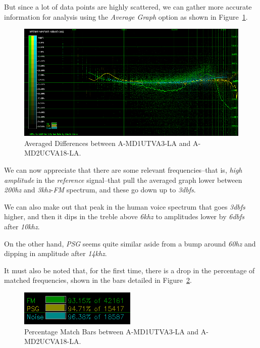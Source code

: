 \documentclass[10pt,a4paper]{report}
\newcommand{\hz}[1]{\textit{\mbox{#1\acrshort{hz}}}}
\newcommand{\khz}[1]{\textit{\mbox{#1\acrshort{khz}}}}
\newcommand{\db}[1]{\textit{\mbox{#1\acrshort{dbfs}}}}
\begin{document}
But since a lot of data points are highly scattered, we can gather more accurate information for analysis using the \textit{Average Graph} option as shown in Figure~\ref{fig:A-MD1UTVA3-LA_vs_A-MD2UCVA18-LA_AVG}.

\begin{figure}[H]
	\centering
	\includegraphics[width=1.0\linewidth]{images/results/5-2-A-MD1UTVA3-LA_vs_A-MD2UCVA18-LA.png}
	\caption[A-MD1UTVA3-LA vs A-MD2UCVA18-LA Averaged]{Averaged Differences between A-MD1UTVA3-LA and A-MD2UCVA18-LA.}
	\label{fig:A-MD1UTVA3-LA_vs_A-MD2UCVA18-LA_AVG}
\end{figure}

We can now appreciate that there are some relevant frequencies--that is, \textit{high amplitude} in the \textit{reference} signal--that pull the averaged graph lower between \hz{200} and \khz{3}-\textit{FM} spectrum, and these go down up to \db{3}.

We can also make out that peak in the human voice spectrum that goes \db{3} higher, and then it dips in the treble above \khz{6} to amplitudes lower by \db{6} after \khz{10}.

On the other hand, \textit{PSG} seems quite similar aside from a bump around \hz{60} and dipping in amplitude after \khz{14}.

It must also be noted that, for the first time, there is a drop in the percentage of matched frequencies, shown in the bars detailed in Figure~\ref{fig:A-MD1UTVA3-LA_vs_A-MD2UCVA18-LA_BARS}.

\begin{figure}[H]
	\centering
	\includegraphics[width=0.4\linewidth]{images/results/5-3-A-MD1UTVA3-LA_vs_A-MD2UCVA18-LA_bars.png}
	\caption[A-MD1UTVA3-LA vs A-MD2UCVA18-LA Bars]{Percentage Match Bars between A-MD1UTVA3-LA and A-MD2UCVA18-LA.}
	\label{fig:A-MD1UTVA3-LA_vs_A-MD2UCVA18-LA_BARS}
\end{figure}
\end{document}
